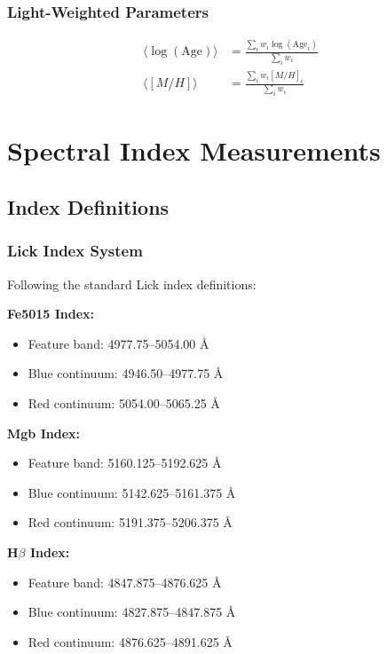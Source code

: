 \documentclass[12pt,a4paper]{article}
\begin{document}
\subsubsection{Light-Weighted Parameters}
\begin{align}
\langle \log(\text{Age}) \rangle &= \frac{\sum_i w_i \log(\text{Age}_i)}{\sum_i w_i} \\
\langle [M/H] \rangle &= \frac{\sum_i w_i [M/H]_i}{\sum_i w_i}
\end{align}

\section{Spectral Index Measurements}

\subsection{Index Definitions}

\subsubsection{Lick Index System}
Following the standard Lick index definitions:

\textbf{Fe5015 Index:}
\begin{itemize}
    \item Feature band: 4977.75--5054.00 \AA
    \item Blue continuum: 4946.50--4977.75 \AA  
    \item Red continuum: 5054.00--5065.25 \AA
\end{itemize}

\textbf{Mgb Index:}
\begin{itemize}
    \item Feature band: 5160.125--5192.625 \AA
    \item Blue continuum: 5142.625--5161.375 \AA
    \item Red continuum: 5191.375--5206.375 \AA
\end{itemize}

\textbf{H$\beta$ Index:}
\begin{itemize}
    \item Feature band: 4847.875--4876.625 \AA  
    \item Blue continuum: 4827.875--4847.875 \AA
    \item Red continuum: 4876.625--4891.625 \AA
\end{itemize}
\end{document}
